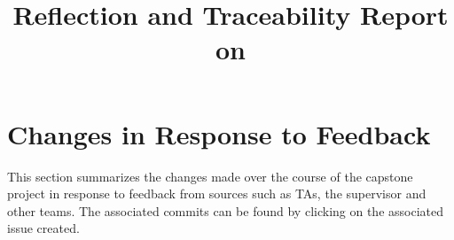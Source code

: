 \documentclass{article}
\title{Reflection and Traceability Report on \progname}
\author{\authname}
\date{}
\begin{document}
\maketitle


\section{Changes in Response to Feedback}
This section summarizes the changes made over the course of the capstone project in response to
feedback from sources such as TAs, the supervisor and other teams. The associated commits can be
found by clicking on the associated issue created.




\end{document}
